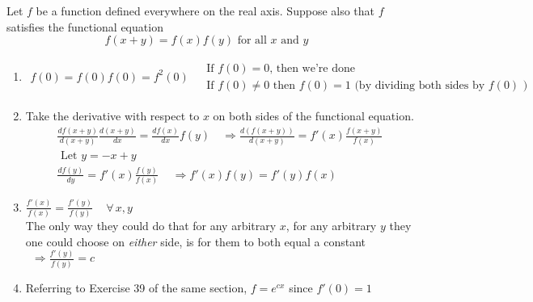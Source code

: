 \documentclass[twoside]{amsart}
\theoremstyle{plain}
\theoremstyle{definition}
\newcommand{\exercisehead}[1]
  {\smallskip
   \noindent{\small\bf Exercise #1.}}
\begin{document}
\exercisehead{40} Let $f$ be a function defined everywhere on the real axis.  Suppose also that $f$ satisfies the functional equation
\[
f(x+y) = f(x)f(y) \text{ for all $x$ and $y$ }
\]
\begin{enumerate}
\item 
\[
\begin{gathered}
  f(0) = f(0)f(0) = f^2(0) 
  \begin{aligned}
    & \text{ If $f(0) = 0$, then we're done } \\
    & \text{ If $f(0) \neq 0$ then } f(0) = 1 \text{ (by dividing both sides by $f(0)$ ) }
  \end{aligned} 
\end{gathered}
\] 
\item Take the derivative with respect to $x$ on both sides of the functional equation.
\[
\begin{gathered}
  \frac{df(x+y)}{d(x+y)}\frac{ d(x+y)}{dx}  = \frac{ df(x)}{ dx} f(y)  \quad \Longrightarrow \frac{ d(f(x+y))}{ d(x+y)} = f'(x) \frac{ f(x+y)}{f(x)} \\
  \boxed{ \text{ Let $y = -x+y$ } } \\
  \frac{df(y)}{dy} = f'(x) \frac{f(y)}{f(x) } \quad \, \Longrightarrow f'(x)f(y) = f'(y)f(x) 
\end{gathered}
\]
\item $\frac{f'(x)}{f(x)} = \frac{f'(y)}{f(y)} \quad \, \forall \, x,y$   \medskip \\
The only way they could do that for any arbitrary $x$, for any arbitrary $y$ they one could choose on \emph{either} side, is for them to both equal a constant \\
\quad \, $\Longrightarrow \frac{f'(y)}{f(y)} = c$
\item Referring to Exercise 39 of the same section, $f=e^{cx}$ since $f'(0)=1$
\end{enumerate}
\end{document}
